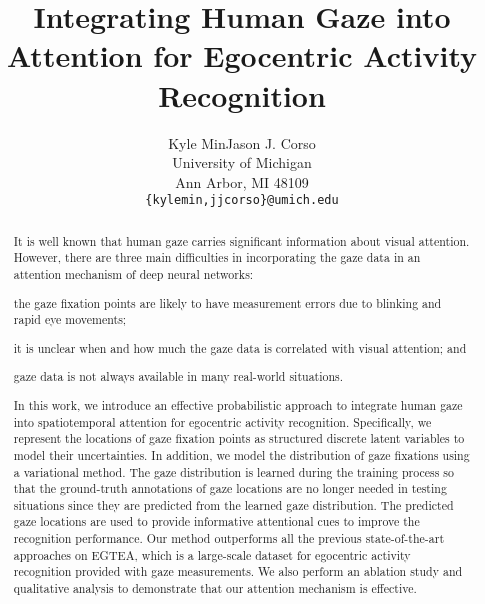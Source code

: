 \documentclass[10pt,twocolumn,letterpaper]{article}
\begin{document}
\title{Integrating Human Gaze into Attention for Egocentric Activity Recognition}

\author{Kyle Min\quad Jason J. Corso\\
University of Michigan\\
Ann Arbor, MI 48109\\
{\tt\small \{kylemin,jjcorso\}@umich.edu}
}

\maketitle


\begin{abstract}
It is well known that human gaze carries significant information about visual attention. However, there are three main difficulties in incorporating the gaze data in an attention mechanism of deep neural networks:
\begin{inlinelist}
  \item the gaze fixation points are likely to have measurement errors due to blinking and rapid eye movements;
  \item it is unclear when and how much the gaze data is correlated with visual attention; and
  \item gaze data is not always available in many real-world situations.
\end{inlinelist}
In this work, we introduce an effective probabilistic approach to integrate human gaze into spatiotemporal attention for egocentric activity recognition. Specifically, we represent the locations of gaze fixation points as structured discrete latent variables to model their uncertainties. In addition, we model the distribution of gaze fixations using a variational method. The gaze distribution is learned during the training process so that the ground-truth annotations of gaze locations are no longer needed in testing situations since they are predicted from the learned gaze distribution. The predicted gaze locations are used to provide informative attentional cues to improve the recognition performance. Our method outperforms all the previous state-of-the-art approaches on EGTEA, which is a large-scale dataset for egocentric activity recognition provided with gaze measurements. We also perform an ablation study and qualitative analysis to demonstrate that our attention mechanism is effective.
\end{abstract}
\end{document}
